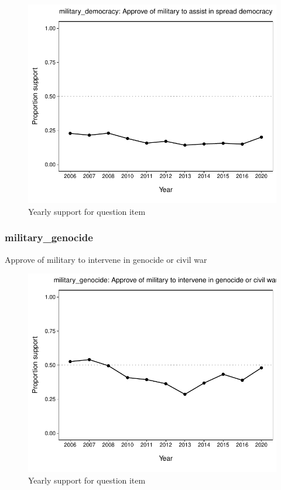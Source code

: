 \documentclass[
  12pt]{article}
\begin{document}
\begin{figure}

{\centering \includegraphics{error-checking_files/figure-latex/unnamed-chunk-3-29} 

}

\caption{Yearly support for question item}\label{fig:unnamed-chunk-3-29}
\end{figure}

\hypertarget{military_genocide}{%
\subsubsection{military\_genocide}\label{military_genocide}}

Approve of military to intervene in genocide or civil war

\begin{figure}

{\centering \includegraphics{error-checking_files/figure-latex/unnamed-chunk-3-30} 

}

\caption{Yearly support for question item}\label{fig:unnamed-chunk-3-30}
\end{figure}
\end{document}

